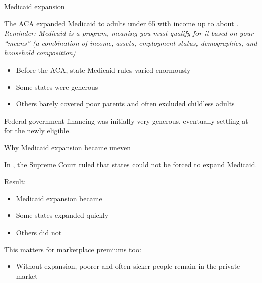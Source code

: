 \begin{frame}{Medicaid expansion}

    The ACA expanded Medicaid to adults under 65 with income up to about .\\
    \textit{Reminder: Medicaid is a  program, meaning you must qualify for it based on your
    ``means'' (a combination of income, assets, employment status, demographics, and
    household composition)}

    \begin{itemize}
        \item Before the ACA, state Medicaid rules varied enormously
        \item Some states were generous
        \item Others barely covered poor parents and often excluded childless adults
    \end{itemize}

    \vspace{3mm}

    Federal government financing was initially very generous, eventually settling at  for the newly eligible.

\end{frame}
\begin{frame}{Why Medicaid expansion became uneven}

    In , the Supreme Court ruled that states could not be forced to expand Medicaid.

    \vspace{3mm}

    Result:
    \begin{itemize}
        \item Medicaid expansion became 
        \item Some states expanded quickly
        \item Others did not
    \end{itemize}

    \vspace{3mm}

    This matters for marketplace premiums too:
    \begin{itemize}
        \item Without expansion, poorer and often sicker people remain in the private market
    \end{itemize}

\end{frame}
